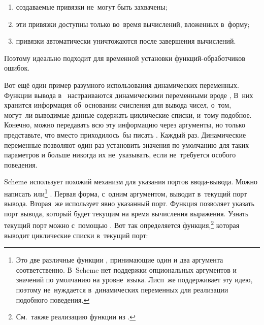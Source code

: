 \begin{enumerate}
  \item создаваемые привязки не~могут быть захвачены;

  \item эти привязки доступны только во~время вычислений,
        вложенных в~форму;

  \item привязки автоматически уничтожаются после завершения
        вычислений.
\end{enumerate}

\noindent
Поэтому  идеально подходит для временной установки
функций-обработчиков ошибок.

Вот ещё один пример разумного использования динамических переменных. Функции
вывода в~{\CommonLisp} настраиваются динамическими переменными вроде
,  {\itd} В~них хранится информация
об~основании счисления для вывода чисел, о~том, могут~ли выводимые данные
содержать циклические списки, и~тому подобное. Конечно, можно передавать всю
эту информацию через аргументы, но только представьте, что вместо  приходилось~бы писать . Каждый раз. Динамические переменные позволяют один
раз установить значения по умолчанию для таких параметров и больше никогда их
не~указывать, если не~требуется особого поведения.

Scheme использует похожий механизм для указания портов ввода-вывода. Можно
написать  или\footnote{Это две различные функции
, принимающие один и два аргумента соответственно. В~Scheme нет
поддержки опциональных аргументов и значений по умолчанию на уровне~языка.
Лисп~же поддерживает эту идею, поэтому не~нуждается в~динамических переменных
для реализации подобного поведения.} .
Первая форма, с~одним аргументом, выводит  в~текущий порт вывода.
Вторая~же использует явно указанный порт. Функция 
позволяет указать порт вывода, который будет текущим на время вычисления
выражения. Узнать текущий порт можно с~помощью . Вот так
определяется функция,\footnote*{См.~также реализацию функции  из
{\CommonLisp}.} которая выводит циклические списки в~текущий порт:

